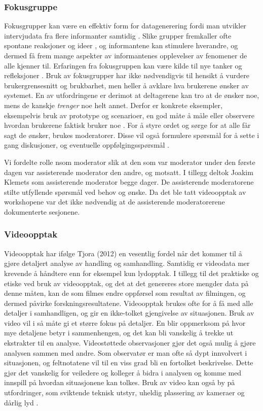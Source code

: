 \subsubsection{Fokusgruppe}
Fokusgrupper kan være en effektiv form for datagenerering fordi man utvikler intervjudata fra flere informanter samtidig \cite{Tjora}. Slike grupper fremkaller ofte spontane reaksjoner og ideer \cite{Nielsen97}, og informantene kan stimulere hverandre, og dermed få frem mange aspekter av informantenes opplevelser av fenomener de alle kjenner til. Erfaringen fra fokusgruppen kan være kilde til nye tanker og refleksjoner \cite{Tjora}. Bruk av fokusgrupper har ikke nødvendigvis til hensikt å vurdere brukergrensesnitt og brukbarhet, men heller å avklare hva brukerene ønsker av systemet. En av utfordringene er derimot at deltagerene kan tro at de ønsker noe, mens de kanskje \emph{trenger} noe helt annet. Derfor er konkrete eksempler, eksempelvis bruk av prototype og scenarioer, en god måte å måle eller observere hvordan brukerene faktisk bruker noe \cite{Nielsen97}.
For å styre ordet og sørge for at alle får sagt de ønsker, brukes moderatorer. Disse vil også formulere spørsmål for å sette i gang diskusjoner, og eventuelle oppfølgingsspørsmål \cite{Tjora}. 

\noindent
Vi fordelte rolle nsom moderator slik at den som var moderator under den første dagen var assisterende moderator den andre, og motsatt. I tillegg deltok Joakim Klemets som assisterende moderator begge dager. De assisterende moderatorene stilte utfyllende spørsmål ved behov og ønske. Da det ble tatt videoopptak av workshopene var det ikke nødvendig at de assisterende moderatorerene dokumenterte sesjonene. 

\subsubsection{Videoopptak}
Videoopptak har ifølge Tjora (2012) en vesentlig fordel når det kommer til å gjøre detaljert analyse av handling og samhandling. Samtidig er videodata mer krevende å håndtere enn for eksempel kun lydopptak. I tillegg til det praktiske og etiske ved bruk av videoopptak, og det at det genereres store mengder data på denne måten, kan de som filmes endre oppførsel som resultat av filmingen, og dermed påvirke forskningsresultatene. Videoopptak brukes ofte for å få med alle detaljer i samhandligen, og gir en ikke-tolket gjengivelse av situasjonen. Bruk av video vil i så måte gi et større fokus på detaljer. En blir oppmerksom på hvor mye detaljene betyr i sammenhengen, og det kan bli vanskelig å trekke ut ekstrakter til en analyse. 
Videostøttede observasjoner gjør det også mulig å gjøre analysen sammen med andre. Som observatør er man ofte så dypt innvolvert i situasjonen, og feltnotatene vil til en viss grad bli en fortolket beskrivelse. Dette gjør det vanskelig for veiledere og kolleger å bidra i analysen og komme med innspill på hvordan situasjonene kan tolkes. 
Bruk av video kan også by på utfordringer, som sviktende teknisk utstyr, uheldig plassering av kameraer og dårlig lyd \cite{Tjora}.

